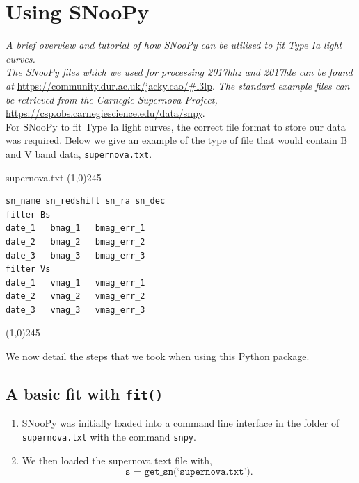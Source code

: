 \documentclass[twocolumn]{revtex4}
\begin{document}
{\clearpage


\twocolumngrid
\vspace{-3ex}
\section{Using SNooPy} \label{app:using_snoopy}
\vspace{-2ex}
\textit{A brief overview and tutorial of how SNooPy can be utilised to fit Type Ia light curves.} \\

\textit{The SNooPy files which we used for processing 2017hhz and 2017hle can be found at} \url{https://community.dur.ac.uk/jacky.cao/#l3lp}. \textit{The standard example files can be retrieved from the Carnegie Supernova Project,} \url{https://csp.obs.carnegiescience.edu/data/snpy}. \\

For SNooPy to fit Type Ia light curves, the correct file format to store our data was required. Below we give an example of the type of file that would contain B and V band data, \texttt{supernova.txt}.
\begin{center}
supernova.txt
\line(1,0){245}
\vspace{-4ex}
\end{center}
\begin{lstlisting}
sn_name sn_redshift sn_ra sn_dec
filter Bs
date_1   bmag_1   bmag_err_1
date_2   bmag_2   bmag_err_2
date_3   bmag_3   bmag_err_3
filter Vs
date_1   vmag_1   vmag_err_1
date_2   vmag_2   vmag_err_2
date_3   vmag_3   vmag_err_3
\end{lstlisting}
\begin{center}
\vspace{-7ex}
\line(1,0){245}
\end{center}

We now detail the steps that we took when using this Python package.

\subsection{A basic fit with \texttt{fit()}}
\begin{enumerate}
 \item SNooPy was initially loaded into a command line interface in the folder of \texttt{supernova.txt} with the command \texttt{snpy}.
 \item We then loaded the supernova text file with,
 \begin{equation*}
 \texttt{s = get\_sn(`supernova.txt')} .
 \end{equation*}
 

\end{enumerate}}
\end{document}
